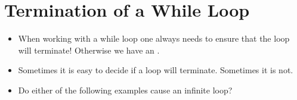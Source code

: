 \documentclass[letterpaper,10pt,english]{sphinxmanual}
\begin{document}
\section{Termination of a While Loop}
\label{\detokenize{lecture_notes/lec12_loops2_for_double:termination-of-a-while-loop}}\begin{itemize}
\item {} 
When working with a while loop one always needs to ensure that the
loop will terminate!  Otherwise we have an .

\item {} 
Sometimes it is easy to decide if a loop will terminate.  Sometimes
it is not.

\item {} 
Do either of the following examples cause an infinite loop?

%
\begin{sphinxVerbatim}[commandchars=\\\{\}]
 
  
   
      
     
\end{sphinxVerbatim}

%
\begin{sphinxVerbatim}[commandchars=\\\{\}]
 
  
   
      
     
\end{sphinxVerbatim}

\end{itemize}
\end{document}
